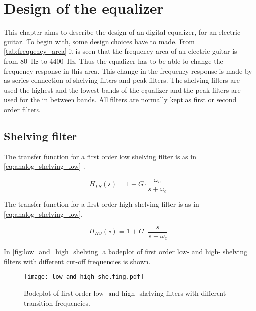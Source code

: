 \section{Design of the equalizer}
This chapter aims to describe the design of an digital equalizer, for an electric guitar. 
To begin with, some design choices have to made. From \autoref{tab:frequency_area} it is seen that the frequency area of an electric guitar is from \SI{80}{\hertz} to \SI{4400}{\hertz}. Thus the equalizer has to be able to change the frequency response in this area. This change in the frequency response is made by as series connection of shelving filters and peak filters. The shelving filters are used the highest and the lowest bands of the equalizer and the peak filters are used for the in between bands. All filters are normally kept as first or second order filters. 

\subsection{Shelving filter}
The transfer function for a first order low shelving filter is as in \autoref{eq:analog_shelving_low} \citep{Julius_smith}.

\begin{equation}\label{eq:analog_shelving_low}
        H_{LS}(s) = 1+G \cdot \frac{\omega_c}{s+\omega_c}
    \end{equation}

    \startexplain
    \stopexplain
    
The transfer function for a first order high shelving filter is as in \autoref{eq:analog_shelving_low}.

\begin{equation}\label{eq:analog_shelving_high}
        H_{HS}(s) = 1+G \cdot \frac{s}{s+\omega_c}
    \end{equation}

    \startexplain
    \stopexplain


    
In \autoref{fig:low_and_high_shelving} a bodeplot of first order low- and high- shelving filters with different cut-off frequencies is shown.

\begin{figure}
    \centering
        \texttt{[image: low\_and\_high\_shelfing.pdf]}
        \caption{Bodeplot of first order low- and high- shelving filters with different transition frequencies.}
        \label{fig:low_and_high_shelving}
  \end{figure} 

